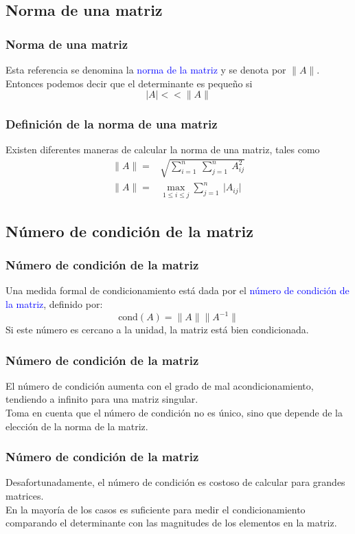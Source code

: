 \subsection*{Norma de una matriz}
\begin{frame}
\frametitle{Norma de una matriz}
Esta referencia se denomina la \textcolor{blue}{norma de la matriz} y se denota por $\parallel A \parallel$.
\\
\bigskip
Entonces podemos decir que el determinante es pequeño si
\[ \vert A \vert << \parallel A \parallel \]
\end{frame}
\begin{frame}
\frametitle{Definición de la norma de una matriz}
Existen diferentes maneras de calcular la norma de una matriz, tales como
\begin{align*}
\parallel A \parallel =& \sqrt{\sum_{i = 1}^{n} \: \sum_{j = 1}^{n} \:  A^{2}_{ij}} \\
\parallel A \parallel =& \max\limits_{1 \leq i \leq j} \sum_{j=1}^{n} \: \vert A_{ij} \vert
\end{align*}
\end{frame}
\subsection{Número de condición de la matriz}
\begin{frame}
\frametitle{Número de condición de la matriz}
Una medida formal de condicionamiento está dada por el \textcolor{blue}{número de condición de la matriz}, definido por:
\[ \mbox{cond}(A) = \parallel A \parallel \parallel A^{-1} \parallel   \]
Si este número es cercano a la unidad, la matriz está bien condicionada.
\end{frame}
\begin{frame}
\frametitle{Número de condición de la matriz}
El número de condición aumenta con el grado de mal acondicionamiento, tendiendo a infinito para una matriz singular.
\\
\bigskip
Toma en cuenta que el número de condición no es único, sino que depende de la elección de la norma de la matriz.
\end{frame}
\begin{frame}
\frametitle{Número de condición de la matriz}
Desafortunadamente, el número de condición es costoso de calcular para grandes matrices.
\\
\bigskip
En la mayoría de los casos es suficiente para medir el condicionamiento comparando el determinante con las magnitudes de los elementos en la matriz.
\end{frame}
